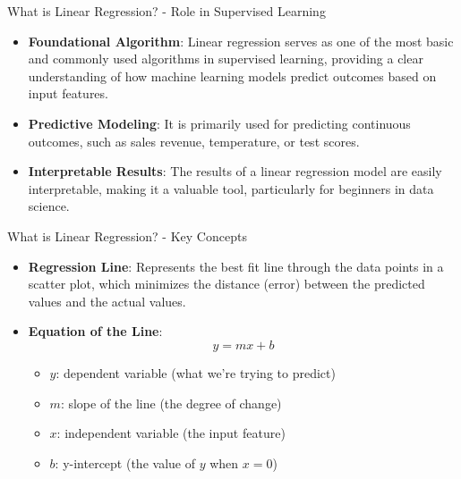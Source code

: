 \documentclass[aspectratio=169]{beamer}
\begin{document}
\begin{frame}[fragile]{What is Linear Regression? - Role in Supervised Learning}
    \begin{itemize}
        \item \textbf{Foundational Algorithm}: Linear regression serves as one of the most basic and commonly used algorithms in supervised learning, providing a clear understanding of how machine learning models predict outcomes based on input features.
        \item \textbf{Predictive Modeling}: It is primarily used for predicting continuous outcomes, such as sales revenue, temperature, or test scores.
        \item \textbf{Interpretable Results}: The results of a linear regression model are easily interpretable, making it a valuable tool, particularly for beginners in data science.
    \end{itemize}
\end{frame}

\begin{frame}[fragile]{What is Linear Regression? - Key Concepts}
    \begin{itemize}
        \item \textbf{Regression Line}: Represents the best fit line through the data points in a scatter plot, which minimizes the distance (error) between the predicted values and the actual values.
        
        \item \textbf{Equation of the Line}:
        \begin{equation}
        y = mx + b
        \end{equation}
        \begin{itemize}
            \item \(y\): dependent variable (what we're trying to predict)
            \item \(m\): slope of the line (the degree of change)
            \item \(x\): independent variable (the input feature)
            \item \(b\): y-intercept (the value of \(y\) when \(x=0\))
        \end{itemize}
    \end{itemize}
\end{frame}
\end{document}

